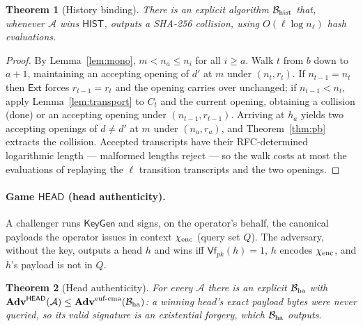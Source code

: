 \documentclass[11pt]{article}
\newtheorem{theorem}{Theorem}
\theoremstyle{remark}
\begin{document}
\begin{theorem}[History binding]\label{thm:hist}
There is an explicit algorithm $\mathcal{B}_{\rm hist}$ that, whenever
$\mathcal{A}$ wins $\mathsf{HIST}$, outputs a SHA-256 collision, using
$O(\ell\log n_\ell)$ hash evaluations.
\end{theorem}
\begin{proof}
By Lemma~\ref{lem:mono}, $m<n_a\le n_i$ for all $i\ge a$. Walk $t$ from $b$
down to $a{+}1$, maintaining an accepting opening of $d'$ at $m$ under
$(n_t,r_t)$. If $n_{t-1}=n_t$ then $\mathsf{Ext}$ forces $r_{t-1}=r_t$ and
the opening carries over unchanged; if $n_{t-1}<n_t$, apply
Lemma~\ref{lem:transport} to $C_t$ and the current opening, obtaining a
collision (done) or an accepting opening under $(n_{t-1},r_{t-1})$. Arriving
at $h_a$ yields two accepting openings of $d\neq d'$ at $m$ under
$(n_a,r_a)$, and Theorem~\ref{thm:pb} extracts the collision. Accepted
transcripts have their RFC-determined logarithmic length --- malformed
lengths reject --- so the walk costs at most the evaluations of replaying the
$\ell$ transition transcripts and the two openings.
\end{proof}

\paragraph{Game $\mathsf{HEAD}$ (head authenticity).}
A challenger runs $\mathsf{KeyGen}$ and signs, on the operator's behalf, the
canonical payloads the operator issues in context $\chi_{\rm enc}$ (query
set $Q$). The adversary, without the key, outputs a head $h$ and wins iff
$\mathsf{Vf}_{pk}(h)=1$, $h$ encodes $\chi_{\rm enc}$, and $h$'s payload is
not in $Q$.

\begin{theorem}[Head authenticity]\label{thm:head}
For every $\mathcal{A}$ there is an explicit $\mathcal{B}_{\rm ha}$ with
$\mathbf{Adv}^{\mathsf{HEAD}}(\mathcal{A})\le
\mathbf{Adv}^{\text{euf-cma}}(\mathcal{B}_{\rm ha})$: a winning head's exact
payload bytes were never queried, so its valid signature is an existential
forgery, which $\mathcal{B}_{\rm ha}$ outputs.
\end{theorem}
\end{document}
